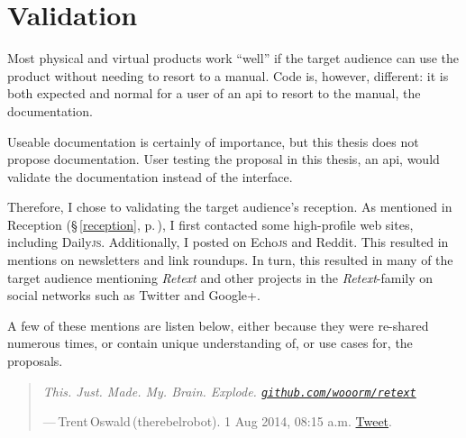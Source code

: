 
\begingroup
\let\clearpage\relax
\let\cleardoublepage\relax
\let\cleardoublepage\relax

\manualmark
{}

\chapter*{Validation}\label{addendum-validation}

Most physical and virtual products work ``well'' if the target audience can
  use the product without needing to resort to a manual.
Code is, however, different: it is both expected and normal for a user of
  an \gls{api} to resort to the manual, the documentation.

Useable documentation is certainly of importance, but this thesis does
  not propose documentation.
User testing the proposal in this thesis, an \gls{api}, would validate the
  documentation instead of the interface.

Therefore, I chose to validating the target audience's reception.
As mentioned in Reception (§\,\ref{reception}, p.\,\pageref{reception}),
  I first contacted some high-profile web sites, including Daily\textsc{js}.
Additionally, I posted on Echo\textsc{js} and Reddit.
This resulted in mentions on newsletters and link roundups.
In turn, this resulted in many of the target audience mentioning \emph{Retext}
  and other projects in the \emph{Retext}-family on social networks such as
  Twitter and Google+.

A few of these mentions are listen below, either because they were re-shared
  numerous times, or contain unique understanding of, or use cases for, the
  proposals.

\begin{quote}
  \textit{This. Just. Made. My. Brain. Explode.
    \href{https://github.com/wooorm/retext}{\nolinkurl{github.com/wooorm/retext}}
  }

  \medskip ---\,Trent\,Oswald\,(therebelrobot). 1 Aug 2014, 08:15 a.m.
  \href{https://twitter.com/therebelrobot/status/495226217805524992}{Tweet}.
\end{quote}

